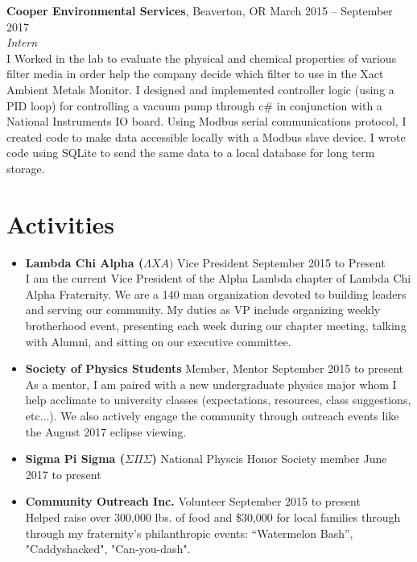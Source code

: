 \documentclass[margin,line]{res}
\begin{document}
\begin{resume}
{\bf Cooper Environmental Services}, Beaverton, OR \hfill{March 2015 -- September 2017}\\
{\em Intern} \\
I Worked in the lab to evaluate the physical and chemical properties of various filter media in order help the company decide which filter to use in the Xact Ambient Metals Monitor. I designed and implemented controller logic (using a PID loop) for controlling a vacuum pump through c\# in conjunction with a National Instruments IO board. Using Modbus serial communications protocol, I created code to make data accessible locally with a Modbus slave device. I wrote code using SQLite to send the same data to a local database for long term storage.

\section{\sc Activities}
\begin{itemize} 
	\item {\bf Lambda Chi Alpha ($\Lambda XA)$} Vice President \hfill September 2015 to Present\\
	I am the current Vice President of the Alpha Lambda chapter of Lambda Chi Alpha Fraternity. We are a 140 man organization devoted to building leaders and serving our community. My duties as VP include organizing weekly brotherhood event, presenting each week during our chapter meeting, talking with Alumni, and sitting on our executive committee. 
	
	\item {\bf Society of Physics Students} Member, Mentor \hfill September 2015 to present\\ 
	As a mentor, I am paired with a new undergraduate physics major whom I help acclimate to university classes (expectations, resources, class suggestions, etc...). We also actively engage the community through outreach events like the August 2017 eclipse viewing.
	
	\item {\bf Sigma Pi Sigma ($\Sigma \Pi \Sigma$)} National Physcis Honor Society member \hfill June 2017 to present
	
	\item {\bf Community Outreach Inc.} Volunteer \hfill September 2015 to present\\
	Helped raise over 300,000 lbs. of food and \$30,000 for local families through through my fraternity's philanthropic events: “Watermelon Bash”, "Caddyshacked", "Can-you-dash".
	

\end{itemize}
\end{resume}
\end{document}
